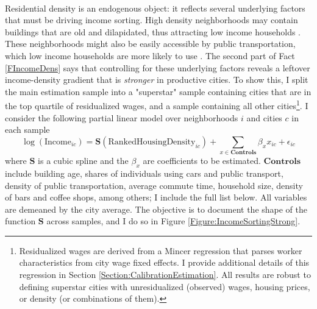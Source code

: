 \documentclass[12pt]{article}
\begin{document}
	\paragraph*{}
	Residential density is an endogenous object: it reflects several underlying factors that must be driving income sorting. High density neighborhoods may contain buildings that are old and dilapidated, thus attracting low income households \citep{Gentrificationcycles}. These neighborhoods might also be easily accessible by public transportation, which low income households are more likely to use \citep{ccpoortransport}. The second part of Fact \ref{FIncomeDens} says that controlling for these underlying factors reveals a leftover income-density gradient that is \textit{stronger} in productive cities. To show this, I split the main estimation sample into a "superstar" sample containing cities that are in the top quartile of residualized wages, and a sample containing all other cities\footnote{Residualized wages are derived from a Mincer regression that parses worker characteristics from city wage fixed effects. I provide additional details of this regression in Section \ref{Section:CalibrationEstimation}. All results are robust to defining superstar cities with unresidualized (observed) wages, housing prices, or density (or combinations of them). }. I consider the following partial linear model over neighborhoods $i$ and cities $c$ in each sample
	\begin{equation}\label{Specification:IncomeSortingStrong}
	\log(\text{Income}_{ic}) = \mathbf{S}(\text{RankedHousingDensity}_{ic}) + \sum_{x \in \mathbf{Controls}}\beta_{x}x_{ic} + \epsilon_{ic}
	\end{equation}
	where $\mathbf{S}$ is a cubic spline and the $\beta_{x}$ are coefficients to be estimated. $\mathbf{Controls}$ include building age, shares of individuals using cars and public transport, density of public transportation, average commute time, household size, density of bars and coffee shops, among others; I include the full list below. All variables are demeaned by the city average. The objective is to document the shape of the function $\mathbf{S}$ across samples, and I do so in Figure \ref{Figure:IncomeSortingStrong}. 
\end{document}
